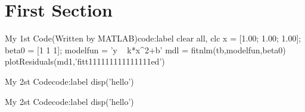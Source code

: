 \documentclass[a4paper,12pt]{article}
\begin{document}
\section{First Section}
\begin{matlab}{My 1st Code(Written by MATLAB)}{code:label}
clear all, clc
x = [1.00; 1.00; 1.00];
beta0 = [1 1 1];
modelfun = 'y ~ k*x^2+b'
mdl = fitnlm(tb,modelfun,beta0)
plotResiduals(md1,'fitt111111111111111ed')









































































\end{matlab}
\begin{matlab}{My 2st Code}{code:label}
disp('hello')
\end{matlab}
\begin{matlab}{My 2st Code}{code:label}
    disp('hello')
\end{matlab}
\end{document}
